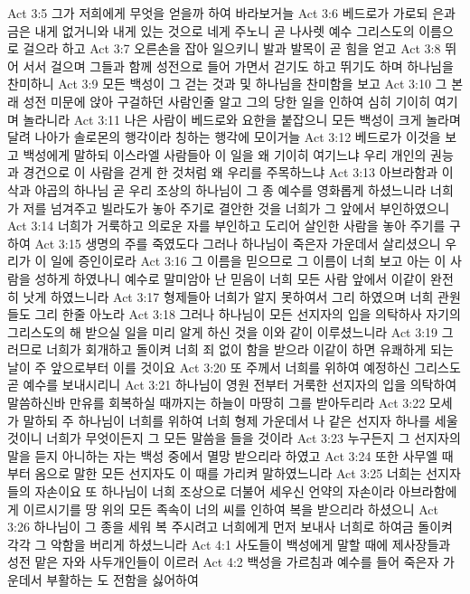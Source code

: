 Act 3:5  그가 저희에게 무엇을 얻을까 하여 바라보거늘
Act 3:6  베드로가 가로되 은과 금은 내게 없거니와 내게 있는 것으로 네게 주노니 곧 나사렛 예수 그리스도의 이름으로 걸으라 하고
Act 3:7  오른손을 잡아 일으키니 발과 발목이 곧 힘을 얻고
Act 3:8  뛰어 서서 걸으며 그들과 함께 성전으로 들어 가면서 걷기도 하고 뛰기도 하며 하나님을 찬미하니
Act 3:9  모든 백성이 그 걷는 것과 및 하나님을 찬미함을 보고
Act 3:10  그 본래 성전 미문에 앉아 구걸하던 사람인줄 알고 그의 당한 일을 인하여 심히 기이히 여기며 놀라니라
Act 3:11  나은 사람이 베드로와 요한을 붙잡으니 모든 백성이 크게 놀라며 달려 나아가 솔로몬의 행각이라 칭하는 행각에 모이거늘
Act 3:12  베드로가 이것을 보고 백성에게 말하되 이스라엘 사람들아 이 일을 왜 기이히 여기느냐 우리 개인의 권능과 경건으로 이 사람을 걷게 한 것처럼 왜 우리를 주목하느냐
Act 3:13  아브라함과 이삭과 야곱의 하나님 곧 우리 조상의 하나님이 그 종 예수를 영화롭게 하셨느니라 너희가 저를 넘겨주고 빌라도가 놓아 주기로 결안한 것을 너희가 그 앞에서 부인하였으니
Act 3:14  너희가 거룩하고 의로운 자를 부인하고 도리어 살인한 사람을 놓아 주기를 구하여
Act 3:15  생명의 주를 죽였도다 그러나 하나님이 죽은자 가운데서 살리셨으니 우리가 이 일에 증인이로라
Act 3:16  그 이름을 믿으므로 그 이름이 너희 보고 아는 이 사람을 성하게 하였나니 예수로 말미암아 난 믿음이 너희 모든 사람 앞에서 이같이 완전히 낫게 하였느니라
Act 3:17  형제들아 너희가 알지 못하여서 그리 하였으며 너희 관원들도 그리 한줄 아노라
Act 3:18  그러나 하나님이 모든 선지자의 입을 의탁하사 자기의 그리스도의 해 받으실 일을 미리 알게 하신 것을 이와 같이 이루셨느니라
Act 3:19  그러므로 너희가 회개하고 돌이켜 너희 죄 없이 함을 받으라 이같이 하면 유쾌하게 되는 날이 주 앞으로부터 이를 것이요
Act 3:20  또 주께서 너희를 위하여 예정하신 그리스도 곧 예수를 보내시리니
Act 3:21  하나님이 영원 전부터 거룩한 선지자의 입을 의탁하여 말씀하신바 만유를 회복하실 때까지는 하늘이 마땅히 그를 받아두리라
Act 3:22  모세가 말하되 주 하나님이 너희를 위하여 너희 형제 가운데서 나 같은 선지자 하나를 세울 것이니 너희가 무엇이든지 그 모든 말씀을 들을 것이라
Act 3:23  누구든지 그 선지자의 말을 듣지 아니하는 자는 백성 중에서 멸망 받으리라 하였고
Act 3:24  또한 사무엘 때부터 옴으로 말한 모든 선지자도 이 때를 가리켜 말하였느니라
Act 3:25  너희는 선지자들의 자손이요 또 하나님이 너희 조상으로 더불어 세우신 언약의 자손이라 아브라함에게 이르시기를 땅 위의 모든 족속이 너의 씨를 인하여 복을 받으리라 하셨으니
Act 3:26  하나님이 그 종을 세워 복 주시려고 너희에게 먼저 보내사 너희로 하여금 돌이켜 각각 그 악함을 버리게 하셨느니라
Act 4:1  사도들이 백성에게 말할 때에 제사장들과 성전 맡은 자와 사두개인들이 이르러
Act 4:2  백성을 가르침과 예수를 들어 죽은자 가운데서 부활하는 도 전함을 싫어하여
